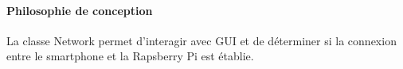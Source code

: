  \paragraph{Philosophie de conception}
La classe Network permet d'interagir avec GUI et de déterminer si la connexion entre le smartphone et la Rapsberry Pi est établie. \\